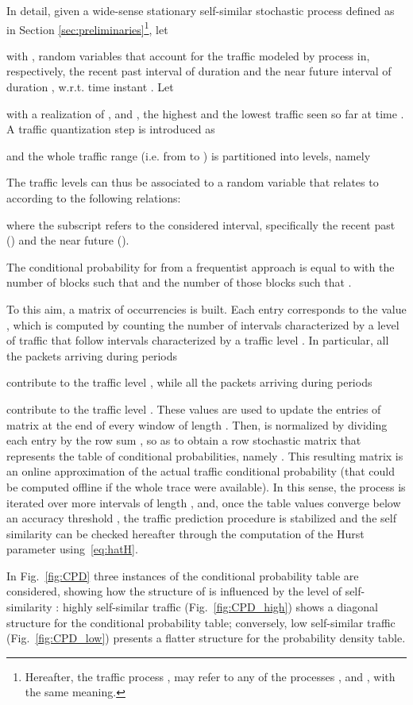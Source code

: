 \documentclass[journal,10pt,twoside,final]{IEEEtran}
\begin{document}
In detail, given a wide-sense stationary self-similar stochastic process  defined as in Section \ref{sec:preliminaries}\footnote{Hereafter, the traffic process  , may refer to any of the processes ,  and , with the same meaning.}, let
 
with ,  random variables that account for the traffic modeled by process  in, respectively, the recent past interval of duration  and the near future interval of duration , w.r.t. time instant . Let
 
with  a realization of , and ,  the highest and the lowest traffic seen so far at time . 
A traffic quantization step  is introduced as  

and the whole traffic range (i.e. from  to ) is partitioned into  levels, namely

The traffic levels can thus be associated to a random variable  that relates to  according to the following relations:

where the subscript  refers to the considered interval, specifically the recent past () and the near future ().

The conditional probability  for  from a frequentist approach is equal to  with  the number of blocks such that  and  the number of those blocks such that .

To this aim, a matrix of occurrencies  is built. Each entry  corresponds to the value , which is computed by counting the number of intervals  characterized by a level of traffic  that follow intervals  characterized by a traffic level . In particular, all the packets arriving during periods

contribute to the traffic level , while all the packets arriving during periods

contribute to the traffic level . These values are used to update the entries of matrix  at the end of every window of length .
Then,  is normalized by dividing each entry  by the row sum , so as to obtain a row stochastic matrix  that represents the table of conditional probabilities, namely .
This resulting matrix  is an online approximation of the actual traffic conditional probability (that could be computed offline if the whole trace were available).
In this sense, the process is iterated over more intervals of length , and, once the table values converge below an accuracy threshold , the traffic prediction procedure is stabilized and the self similarity can be checked hereafter through the computation of the Hurst parameter  using~\eqref{eq:hatH}.


In Fig.~\ref{fig:CPD} three instances of the conditional probability table are considered, showing how the structure of  is influenced by the level of self-similarity : highly self-similar traffic (Fig.~\ref{fig:CPD_high}) shows a diagonal structure for the conditional probability table; conversely, low self-similar traffic (Fig.~\ref{fig:CPD_low}) presents a flatter structure for the probability density table.
\end{document}
